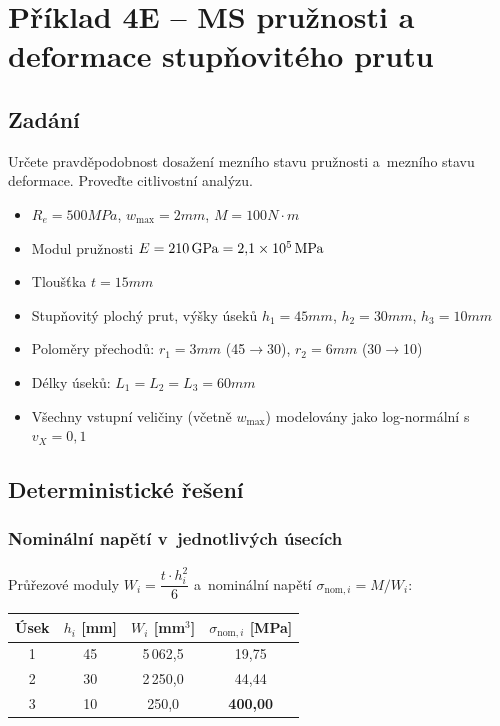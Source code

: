 
\section{Příklad 4E -- MS pružnosti a deformace stupňovitého prutu}

\subsection{Zadání}

Určete pravděpodobnost dosažení mezního stavu pružnosti a~mezního stavu deformace. Proveďte citlivostní analýzu.

\begin{itemize}[nosep]
    \item $R_e = 500\unit{MPa}$, $w_{\max} = 2\unit{mm}$, $M = 100\unit{N \cdot m}$
    \item Modul pružnosti $E = 210\,\mathrm{GPa} = 2{,}1 \times 10^{5}\,\mathrm{MPa}$
    \item Tloušťka $t = 15\unit{mm}$
    \item Stupňovitý plochý prut, výšky úseků $h_1 = 45\unit{mm}$, $h_2 = 30\unit{mm}$, $h_3 = 10\unit{mm}$
    \item Poloměry přechodů: $r_1 = 3\unit{mm}$ (45$\to$30), $r_2 = 6\unit{mm}$ (30$\to$10)
    \item Délky úseků: $L_1 = L_2 = L_3 = 60\unit{mm}$
    \item Všechny vstupní veličiny (včetně $w_{\max}$) modelovány jako log-normální s~$v_X = 0{,}1$
\end{itemize}

\subsection{Deterministické řešení}

\subsubsection{Nominální napětí v~jednotlivých úsecích}

Průřezové moduly $W_i = \dfrac{t \cdot h_i^2}{6}$ a~nominální napětí $\sigma_{\mathrm{nom},i} = M/W_i$:

\begin{table}[H]
\centering
\begin{tabular}{cccc}
\toprule
\textbf{Úsek} & $h_i$ [mm] & $W_i$ [mm$^3$] & $\sigma_{\mathrm{nom},i}$ [MPa] \\
\midrule
1 & 45 & 5\,062{,}5 & 19{,}75 \\
2 & 30 & 2\,250{,}0 & 44{,}44 \\
3 & 10 & 250{,}0 & \textbf{400{,}00} \\
\bottomrule
\end{tabular}
\end{table}

